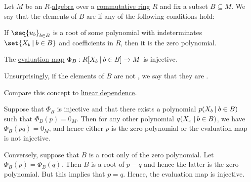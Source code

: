 \begin{definition}\label{def:algebraic_dependence}\mimprovised
  Let \( M \) be an \( R \)-\hyperref[def:algebra_over_ring]{algebra} over a \hyperref[def:ring/commutative]{commutative ring} \( R \) and fix a subset \( B \subseteq M \). We say that the elements of \( B \) are  if any of the following conditions hold:

  \begin{thmenum}
     If \( \seq{ u_b }_{b \in B} \) is a root of some polynomial with indeterminates \( \set{ X_b \given b \in B } \) and coefficients in \( R \), then it is the zero polynomial.

     The \hyperref[thm:polynomial_semiring_universal_property]{evaluation map} \( \Phi_B: R[X_b \given b \in B] \to M \) is injective.
  \end{thmenum}

  Unsurprisingly, if the elements of \( B \) are not , we say that they are .

  Compare this concept to \hyperref[def:linear_dependence]{linear dependence}.
\end{definition}
\begin{defproof}
   Suppose that \( \Phi_B \) is injective and that there exists a polynomial \( p(X_b \given b \in B) \) such that \( \Phi_B(p) = 0_M \). Then for any other polynomial \( q(X_x \given b \in B) \), we have \( \Phi_B(p q) = 0_M \), and hence either \( p \) is the zero polynomial or the evaluation map is not injective.

   Conversely, suppose that \( B \) is a root only of the zero polynomial. Let \( \Phi_B(p) = \Phi_B(q) \). Then \( B \) is a root of \( p - q \) and hence the latter is the zero polynomial. But this implies that \( p = q \). Hence, the evaluation map is injective.
\end{defproof}

